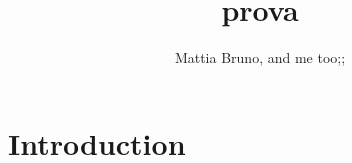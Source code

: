 \documentclass{article}
\title{prova}
\author{Mattia Bruno, and me too;;}
\date{today, \date,}
\begin{document}
\maketitle

\section{Introduction}
\end{document}
